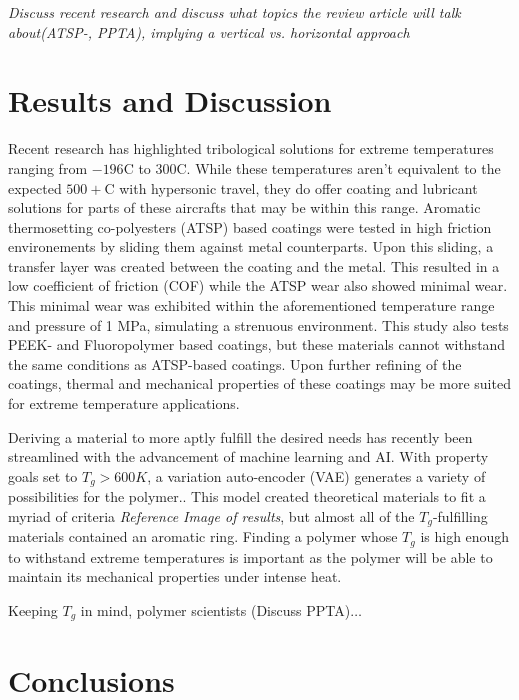 \documentclass[12pt]{article}
\begin{document}
\indent \textit{Discuss recent research and discuss what topics the review article will talk about(ATSP-\cite{Bashandeh2021}, PPTA\cite{LiTong2022}), implying a vertical vs. horizontal approach}
	
\section{Results and Discussion}

\indent Recent research has highlighted tribological solutions for extreme temperatures ranging from $-196$\degree C to $300$\degree C. While these temperatures aren't equivalent to the expected $500+$\degree C with hypersonic travel, they do offer coating and lubricant solutions for parts of these aircrafts that may be within this range. Aromatic thermosetting co-polyesters (ATSP) based coatings were tested in high friction environements by sliding them against metal counterparts. Upon this sliding, a transfer layer was created between the coating and the metal. This resulted in a low coefficient of friction (COF) while the ATSP wear also showed minimal wear. This minimal wear was exhibited within the aforementioned temperature range and pressure of 1 MPa, simulating a strenuous environment. \citep{Bashandeh2021} This study also tests PEEK- and Fluoropolymer based coatings, but these materials cannot withstand the same conditions as ATSP-based coatings. Upon further refining of the coatings, thermal and mechanical properties of these coatings may be more suited for extreme temperature applications. 

\indent Deriving a material to more aptly fulfill the desired needs has recently been streamlined with the advancement of machine learning and AI. With property goals set to $T_g>600K$, a variation auto-encoder (VAE) generates a variety of possibilities for the polymer.\citep{Batra2020}. This model created theoretical materials to fit a myriad of criteria \textit{Reference Image of results}, but almost all of the $T_g$-fulfilling materials contained an aromatic ring. Finding a polymer whose $T_g$ is high enough to withstand extreme temperatures is important as the polymer will be able to maintain its mechanical properties under intense heat. 

\indent Keeping $T_g$ in mind, polymer scientists (Discuss PPTA)$\dots$

\section{Conclusions}
\end{document}
